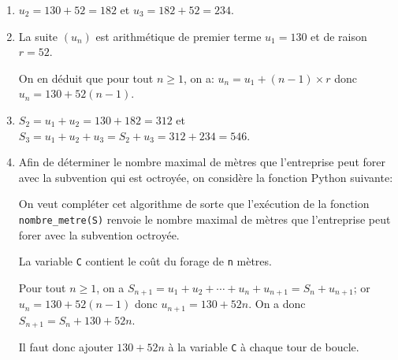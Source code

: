 \begin{enumerate}
\item  $u_2=130+52=182$ et $u_3=182+52= 234$.
\item La suite $\left(u_n\right)$ est arithmétique de premier terme $u_1=130$ et de raison $r=52$.


On en déduit que pour tout $n\geqslant 1$, on a: $u_n=u_1+(n-1)\times r$ donc $u_n=130+52(n-1)$.

\item $S_2= u_1+u_2 = 130+182=312$ et $S_3=u_1+u_2+u_3 = S_2+u_3=312+234=546$.

\item Afin de déterminer le nombre maximal de mètres que l'entreprise peut forer avec la subvention qui est octroyée, on considère la fonction Python suivante:

\begin{center}
\end{center}

On veut compléter cet algorithme de sorte que l'exécution de la fonction \verb!nombre_metre(S)! renvoie le nombre maximal de mètres que l'entreprise peut forer avec la subvention octroyée. %

La variable \texttt{C} contient le coût du forage de \texttt{n} mètres.

Pour tout $n\geqslant 1$, on a $S_{n+1}= u_1+u_2+\cdots + u_n + u_{n+1} = S_n+u_{n+1}$; or $u_n=130+52\left (n-1\right )$ donc $u_{n+1} =130+52n$. On a donc $S_{n+1} = S_n + 130 + 52n$.

Il faut donc ajouter $130+52n$ à la variable  \texttt{C} à chaque tour de boucle.

\begin{center}
\end{center}


\end{enumerate}
